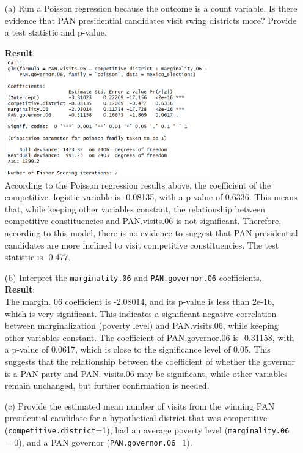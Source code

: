 \documentclass[12pt,letterpaper]{article}
\begin{document}
\begin{enumerate}
	\item [(a)]
	Run a Poisson regression because the outcome is a count variable. Is there evidence that PAN presidential candidates visit swing districts more? Provide a test statistic and p-value.
	 
	\textbf{Result}:\\
	\includegraphics[width=0.7\textwidth]{Q2_1.png}\\
	According to the Poisson regression results above, the coefficient of the competitive. logistic variable is -0.08135, with a p-value of 0.6336. This means that, while keeping other variables constant, the relationship between competitive constituencies and PAN.visits.06 is not significant. Therefore, according to this model, there is no evidence to suggest that PAN presidential candidates are more inclined to visit competitive constituencies. The test statistic is -0.477.\\
	\item [(b)]
	Interpret the \texttt{marginality.06} and \texttt{PAN.governor.06} coefficients.\\
	\textbf{Result}:\\
	The margin. 06 coefficient is -2.08014, and its p-value is less than 2e-16, which is very significant. This indicates a significant negative correlation between marginalization (poverty level) and PAN.visits.06, while keeping other variables constant. The coefficient of PAN.governor.06 is -0.31158, with a p-value of 0.0617, which is close to the significance level of 0.05. This suggests that the relationship between the coefficient of whether the governor is a PAN party and PAN. visits.06 may be significant, while other variables remain unchanged, but further confirmation is needed.\\
	\item [(c)]
	Provide the estimated mean number of visits from the winning PAN presidential candidate for a hypothetical district that was competitive (\texttt{competitive.district}=1), had an average poverty level (\texttt{marginality.06} = 0), and a PAN governor (\texttt{PAN.governor.06}=1).

\end{enumerate}
\end{document}
